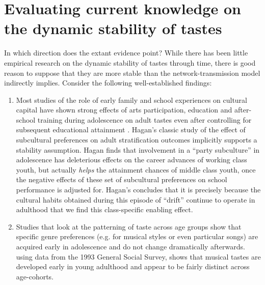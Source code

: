 \section{Evaluating current knowledge on the dynamic stability of tastes}
In which direction does the extant evidence point?  While there has been little empirical research on the dynamic stability of tastes through time, there is good reason to suppose that they are more stable than the network-transmission model indirectly implies.  Consider the following well-established findings:

\begin{enumerate}
\item  Most studies of the role of early family and school experiences on cultural capital have shown strong effects of arts participation, education and after-school training during adolescence on adult tastes even after controlling for subsequent educational attainment \citep{kracman96}. Hagan's \citeyearpar{hagan91} classic study of the effect of subcultural preferences on adult stratification outcomes implicitly supports a stability assumption. Hagan finds that involvement in a ``party subculture'' in adolescence has deleterious effects on the career advances of working class youth, but actually \emph{helps} the attainment chances of middle class youth, once the negative effects of these set of subcultural preferences on school performance is adjusted for. Hagan's concludes that it is precisely because the cultural habits obtained during this episode of ``drift'' continue to operate in adulthood that we find this class-specific enabling effect.

\item Studies that look at the patterning of taste across age groups show that specific genre preferences (e.g. for musical styles or even particular songs) are acquired early in adolescence and do not change dramatically afterwards. \citet{smith95} using data from the 1993 General Social Survey, shows that musical tastes are developed early in young adulthood and appear to be fairly distinct across age-cohorts.  


\end{enumerate}
